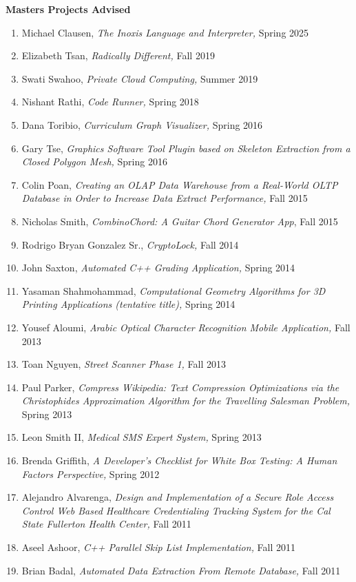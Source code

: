 \documentclass[11pt]{letter}
\begin{document}
\textbf{Masters Projects Advised}
\begin{enumerate}
\item Michael Clausen, \emph{The Inoxis Language and Interpreter,} Spring 2025
\item Elizabeth Tsan, \emph{Radically Different,} Fall 2019
\item Swati Swahoo, \emph{Private Cloud Computing,} Summer 2019
\item Nishant Rathi, \emph{Code Runner,} Spring 2018
\item Dana Toribio, \emph{Curriculum Graph Visualizer,} Spring 2016
\item Gary Tse, \emph{Graphics Software Tool Plugin based on Skeleton Extraction from a Closed Polygon Mesh,} Spring 2016
\item Colin Poan, \emph{Creating an OLAP Data Warehouse from a Real-World OLTP Database in Order to Increase Data Extract Performance,} Fall 2015
\item Nicholas Smith, \emph{CombinoChord: A Guitar Chord Generator App}, Fall 2015
\item Rodrigo Bryan Gonzalez Sr., \emph{CryptoLock,} Fall 2014
\item John Saxton, \emph{Automated C++ Grading Application,} Spring 2014
\item Yasaman Shahmohammad, \emph{Computational Geometry Algorithms for 3D Printing Applications (tentative title),} Spring 2014
\item Yousef Aloumi, \emph{Arabic Optical Character Recognition Mobile Application,} Fall 2013
\item Toan Nguyen, \emph{Street Scanner Phase 1,} Fall 2013
\item Paul Parker, \emph{Compress Wikipedia: Text Compression Optimizations via the Christophides Approximation Algorithm for the Travelling Salesman Problem,} Spring 2013
\item Leon Smith II, \emph{Medical SMS Expert System,} Spring 2013
\item Brenda Griffith, \emph{A Developer’s Checklist for White Box Testing: A Human Factors Perspective,} Spring 2012
\item Alejandro Alvarenga, \emph{Design and Implementation of a Secure Role Access Control Web Based Healthcare Credentialing Tracking System for the Cal State Fullerton Health Center,} Fall 2011
\item Aseel Ashoor, \emph{C++ Parallel Skip List Implementation,} Fall 2011
\item Brian Badal, \emph{Automated Data Extraction From Remote Database,} Fall 2011

\end{enumerate}
\end{document}
